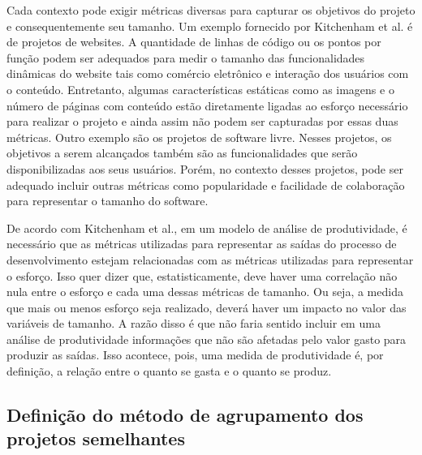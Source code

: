 Cada contexto pode exigir métricas diversas para capturar os objetivos do projeto e consequentemente seu tamanho. Um exemplo fornecido por Kitchenham et al.\cite{kitchenham2004software} é de projetos de websites. A quantidade de linhas de código ou os pontos por função podem ser adequados para medir o tamanho das funcionalidades dinâmicas do website tais como comércio eletrônico e  interação dos usuários com o conteúdo. Entretanto, algumas características estáticas como as imagens e o número de páginas com conteúdo estão diretamente ligadas ao esforço necessário para realizar o projeto e ainda assim não podem ser capturadas por essas duas métricas. Outro exemplo são os projetos de software livre.  Nesses projetos, os objetivos a serem alcançados também são as funcionalidades que serão disponibilizadas aos seus usuários. Porém, no contexto desses projetos, pode ser adequado incluir outras métricas como popularidade e facilidade de colaboração para representar o tamanho do software. 

De acordo com Kitchenham et al.\cite{kitchenham2004software}, em um modelo de análise de produtividade, é necessário que as métricas utilizadas para representar as saídas do processo de desenvolvimento estejam relacionadas com as métricas utilizadas para representar o esforço. Isso quer dizer que, estatisticamente, deve haver uma correlação não nula entre o esforço e cada uma dessas métricas de tamanho. Ou seja, a medida que mais ou menos esforço seja realizado, deverá haver um impacto no valor das variáveis de tamanho. A razão disso é que não faria sentido incluir em uma análise de produtividade informações que não são afetadas pelo valor gasto para produzir as saídas. Isso acontece, pois, uma medida de produtividade é, por definição, a relação entre o quanto se gasta e o quanto se produz. 







\subsection{Definição do método de agrupamento dos projetos semelhantes }

